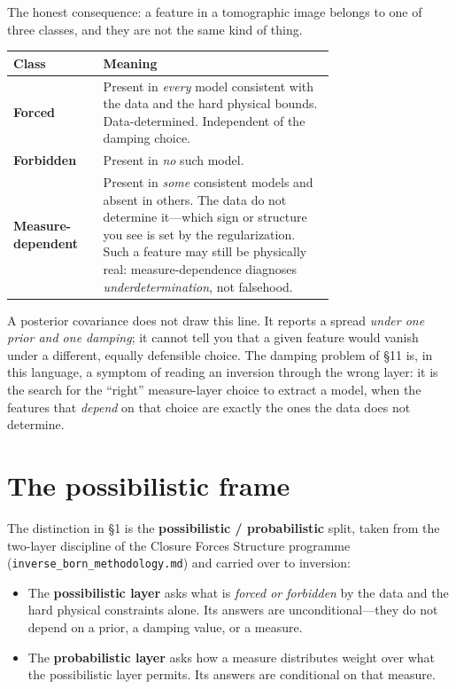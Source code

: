 \documentclass[11pt]{article}
\newcommand{\file}[1]{\texttt{#1}}
\begin{document}
The honest consequence: a feature in a tomographic image belongs to one of
three classes, and they are not the same kind of thing.

\begin{table}[htbp]
\centering
\renewcommand{\arraystretch}{1.25}
\begin{tabular}{@{}l p{0.72\linewidth}@{}}
\toprule
\textbf{Class} & \textbf{Meaning} \\
\midrule
\textbf{Forced} & Present in \emph{every} model consistent with the data and
the hard physical bounds. Data-determined. Independent of the damping choice. \\
\textbf{Forbidden} & Present in \emph{no} such model. \\
\textbf{Measure-dependent} & Present in \emph{some} consistent models and
absent in others. The data do not determine it---which sign or structure you
see is set by the regularization. Such a feature may still be physically real:
measure-dependence diagnoses \emph{underdetermination}, not falsehood. \\
\bottomrule
\end{tabular}
\end{table}

A posterior covariance does not draw this line. It reports a spread \emph{under
one prior and one damping}; it cannot tell you that a given feature would
vanish under a different, equally defensible choice. The damping problem of
\S11 is, in this language, a symptom of reading an inversion through the wrong
layer: it is the search for the ``right'' measure-layer choice to extract a
model, when the features that \emph{depend} on that choice are exactly the ones
the data does not determine.

\section{The possibilistic frame}

The distinction in \S1 is the \textbf{possibilistic / probabilistic} split,
taken from the two-layer discipline of the Closure Forces Structure programme
(\file{inverse\_born\_methodology.md}) and carried over to inversion:

\begin{itemize}
\item The \textbf{possibilistic layer} asks what is \emph{forced or forbidden}
  by the data and the hard physical constraints alone. Its answers are
  unconditional---they do not depend on a prior, a damping value, or a measure.
\item The \textbf{probabilistic layer} asks how a measure distributes weight
  over what the possibilistic layer permits. Its answers are conditional on
  that measure.
\end{itemize}
\end{document}
